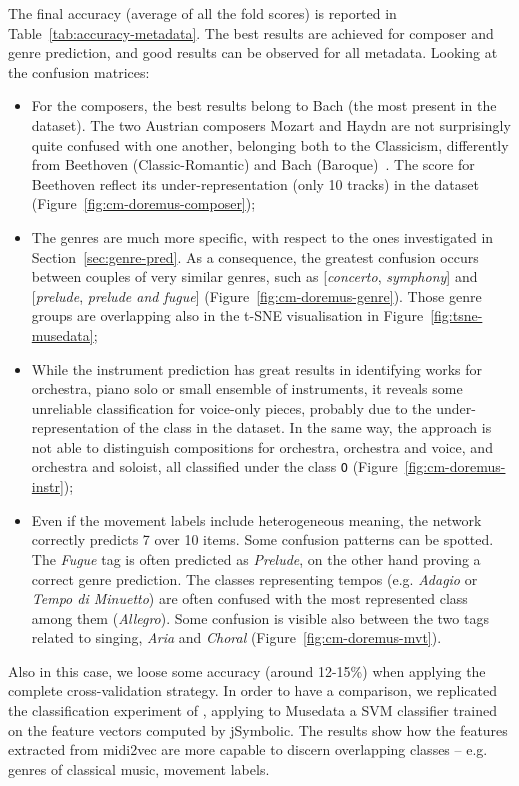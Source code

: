 \documentclass{article}
\newcommand{\secref}[1]{\mbox{Section~\ref{#1}}}
\newcommand{\tabref}[1]{\mbox{Table~\ref{#1}}}
\newcommand{\figref}[1]{\mbox{Figure~\ref{#1}}}
\begin{document}
The final accuracy (average of all the fold scores) is reported in \tabref{tab:accuracy-metadata}. The best results are achieved for composer and genre prediction, and good results can be observed for all metadata.
Looking at the confusion matrices:
\begin{itemize}
    \item For the composers, the best results belong to Bach (the most present in the dataset). The two Austrian composers Mozart and Haydn are not surprisingly quite confused with one another, belonging both to the Classicism, differently from Beethoven (Classic-Romantic) and Bach (Baroque)~\citep{rosen1997classical}. The score for Beethoven reflect its under-representation (only 10 tracks) in the dataset (\figref{fig:cm-doremus-composer}); 
    \item The genres are much more specific, with respect to the ones investigated in \secref{sec:genre-pred}. As a consequence, the greatest confusion occurs between couples of very similar genres, such as [\textit{concerto}, \textit{symphony}] and [\textit{prelude}, \textit{prelude and fugue}] (\figref{fig:cm-doremus-genre}). Those genre groups are overlapping also in the t-SNE visualisation in \figref{fig:tsne-musedata};
    \item While the instrument prediction has great results in identifying works for orchestra, piano solo or small ensemble of instruments, it reveals some unreliable classification for voice-only pieces, probably due to the under-representation of the class in the dataset. In the same way, the approach is not able to distinguish compositions for orchestra, orchestra and voice, and orchestra and soloist, all classified under the class \texttt{O} (\figref{fig:cm-doremus-instr});
    \item Even if the movement labels include heterogeneous meaning, the network correctly predicts 7 over 10 items. Some confusion patterns can be spotted. The \textit{Fugue} tag is often predicted as \textit{Prelude}, on the other hand proving a correct genre prediction. The classes representing tempos (e.g. \textit{Adagio} or \textit{Tempo di Minuetto}) are often confused with the most represented class among them (\textit{Allegro}). Some confusion is visible also between the two tags related to singing, \textit{Aria} and \textit{Choral} (\figref{fig:cm-doremus-mvt}).
\end{itemize}

Also in this case, we loose some accuracy (around 12-15\%) when applying the complete cross-validation strategy. In order to have a comparison, we replicated the classification experiment of \cite{mckay2018}, applying to Musedata a SVM classifier trained on the feature vectors computed by jSymbolic. The results show how the features extracted from midi2vec are more capable to discern overlapping classes -- e.g. genres of classical music, movement labels.
\end{document}
